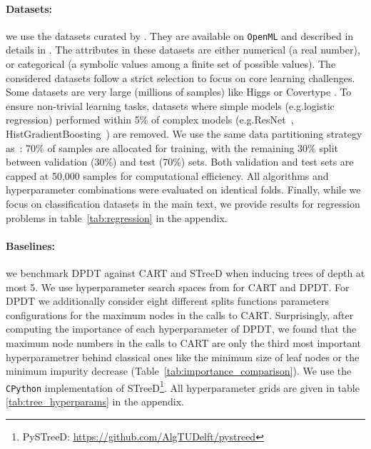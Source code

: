 \paragraph{Datasets:} we use the datasets curated by \cite{grinsztajn2022tree}. They are available on \texttt{OpenML} \cite{10.1145/2641190.2641198} and described in details in \cite[Appendix A.1]{grinsztajn2022tree}. The attributes in these datasets are either %
numerical (a real number), or categorical (a symbolic values among a finite set of possible values). %
The considered datasets follow a strict selection \cite[Section 3]{grinsztajn2022tree} to focus on core learning challenges. Some datasets are very large (millions of samples) like Higgs or Covertype \cite{higgs_280,covertype_31}. To ensure non-trivial learning tasks, datasets where simple models (e.g.\@ logistic regression) performed within 5\% of complex models (e.g.\@ ResNet~\cite{resnet}, HistGradientBoosting~\cite{scikit-learn}) are removed. We use the same data partitioning strategy as~\cite{grinsztajn2022tree}: 70\% of samples are allocated for training, with the remaining 30\% split between validation (30\%) and test (70\%) sets. Both validation and test sets are capped at 50,000 samples for computational efficiency. All algorithms and hyperparameter combinations were evaluated on identical folds. Finally, while we focus on classification datasets in the main text, we provide results for regression problems in table~\ref{tab:regression} in the appendix.

\paragraph{Baselines:}
we benchmark DPDT against CART and STreeD when inducing trees of depth at most 5.  We use hyperparameter search spaces from \cite{komer-proc-scipy-2014} for CART and DPDT. For DPDT we additionally consider eight different splits functions parameters configurations for the maximum nodes in the calls to CART. Surprisingly, after computing the importance of each hyperparameter of DPDT, we found that the maximum node numbers in the calls to CART are only the third most important hyperparametrer behind classical ones like the minimum size of leaf nodes or the minimum impurity decrease (Table~\ref{tab:importance_comparison}). We use the \texttt{CPython} implementation of STreeD\footnote{PySTreeD: \url{https://github.com/AlgTUDelft/pystreed}}. All hyperparameter grids are given in table \ref{tab:tree_hyperparams} in the appendix.

